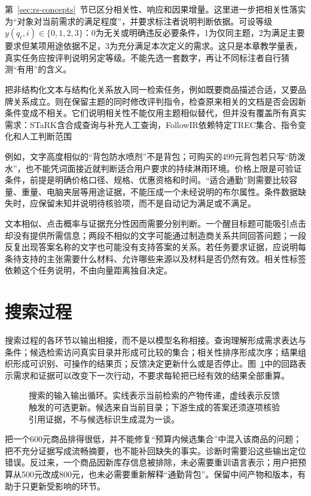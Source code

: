 第~\ref{sec:rs-concepts}~节已区分相关性、响应和因果增量。这里进一步把相关性落实为“对象对当前需求的满足程度”，并要求标注者说明判断依据。可设等级$y(q_t,i)\in\{0,1,2,3\}$：0为无关或明确违反必要条件，1为仅同主题，2为满足主要要求但某项用途依据不足，3为充分满足本次定义的需求。这只是本章教学量表，真实任务应按评判说明另定等级。不能先选一套数字，再让不同标注者自行猜测“有用”的含义。

\Needspace{130mm}
把非结构化文本与结构化关系放入同一检索任务，例如既要商品描述合适，又要品牌关系成立。则在保留主题的同时修改评判指令，检查原来相关的文档是否会因新条件变成不相关。它们说明相关性不能仅用主题相似替代，但并没有覆盖所有真实需求：STaRK含合成查询与补充人工查询，FollowIR依赖特定TREC集合、指令变化和人工判断范围

例如，文字高度相似的“背包防水喷剂”不是背包；可购买的499元背包若只写“防泼水”，也不能凭词面接近就判断适合用户要求的持续淋雨环境。价格上限是可验证条件，前提是明确价格口径、规格、优惠资格和时间。“适合通勤”则需要比较容量、重量、电脑夹层等用途证据，不能压成一个未经说明的布尔属性。条件数据缺失时，应保留未知并说明待核验项，而不是自动记为满足或不满足。

文本相似、点击概率与证据充分性因而需要分别判断。一个醒目标题可能吸引点击却没有提供所需信息；两段不相似的文字可能通过制造商关系共同回答问题；一段反复出现答案名称的文字也可能没有支持答案的关系。若任务要求证据，应说明每条待支持的主张需要什么材料、允许哪些来源以及材料是否仍然有效。相关性标签依赖这个任务说明，不由向量距离独自决定。

\section{搜索过程}
\label{sec:rs-search-process}

搜索过程的各环节以输出相接，而不是以模型名称相接。查询理解形成需求表达与条件；候选检索访问真实目录并形成可比较的集合；相关性排序形成次序；结果组织形成可识别、可操作的结果页；反馈决定更新什么或是否停止。图~\ref{fig:rs-search-cycle}中的回路表示需求和证据可以改变下一次行动，不要求每轮把已经有效的结果全部重算。

\begin{figure}[htbp]
 \centering
 
 \caption{搜索的输入输出循环。实线表示当前检索的产物传递，虚线表示反馈触发的可选更新。候选来自当前目录；下游生成的答案还须逐项核验引用证据，不与候选标识生成混为一谈。}
 \label{fig:rs-search-cycle}
\end{figure}

把一个600元商品排得很低，并不能修复“预算内候选集合”中混入该商品的问题；把不充分证据写成流畅摘要，也不能补回缺失的事实。诊断时需要沿这些输出定位错误。反过来，一个商品因新库存信息被排除，未必需要重训语言表示；用户把预算从500元改成800元，也未必需要重新解释“通勤背包”。保留中间产物和版本，有助于只更新受影响的环节。

